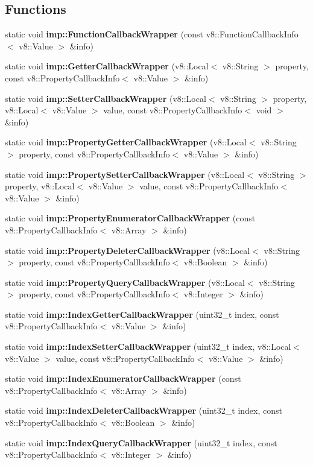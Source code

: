 \subsection*{Functions}
\begin{DoxyCompactItemize}
\item 
static void \textbf{ imp\+::\+Function\+Callback\+Wrapper} (const v8\+::\+Function\+Callback\+Info$<$ v8\+::\+Value $>$ \&info)
\item 
static void \textbf{ imp\+::\+Getter\+Callback\+Wrapper} (v8\+::\+Local$<$ v8\+::\+String $>$ property, const v8\+::\+Property\+Callback\+Info$<$ v8\+::\+Value $>$ \&info)
\item 
static void \textbf{ imp\+::\+Setter\+Callback\+Wrapper} (v8\+::\+Local$<$ v8\+::\+String $>$ property, v8\+::\+Local$<$ v8\+::\+Value $>$ value, const v8\+::\+Property\+Callback\+Info$<$ void $>$ \&info)
\item 
static void \textbf{ imp\+::\+Property\+Getter\+Callback\+Wrapper} (v8\+::\+Local$<$ v8\+::\+String $>$ property, const v8\+::\+Property\+Callback\+Info$<$ v8\+::\+Value $>$ \&info)
\item 
static void \textbf{ imp\+::\+Property\+Setter\+Callback\+Wrapper} (v8\+::\+Local$<$ v8\+::\+String $>$ property, v8\+::\+Local$<$ v8\+::\+Value $>$ value, const v8\+::\+Property\+Callback\+Info$<$ v8\+::\+Value $>$ \&info)
\item 
static void \textbf{ imp\+::\+Property\+Enumerator\+Callback\+Wrapper} (const v8\+::\+Property\+Callback\+Info$<$ v8\+::\+Array $>$ \&info)
\item 
static void \textbf{ imp\+::\+Property\+Deleter\+Callback\+Wrapper} (v8\+::\+Local$<$ v8\+::\+String $>$ property, const v8\+::\+Property\+Callback\+Info$<$ v8\+::\+Boolean $>$ \&info)
\item 
static void \textbf{ imp\+::\+Property\+Query\+Callback\+Wrapper} (v8\+::\+Local$<$ v8\+::\+String $>$ property, const v8\+::\+Property\+Callback\+Info$<$ v8\+::\+Integer $>$ \&info)
\item 
static void \textbf{ imp\+::\+Index\+Getter\+Callback\+Wrapper} (uint32\+\_\+t index, const v8\+::\+Property\+Callback\+Info$<$ v8\+::\+Value $>$ \&info)
\item 
static void \textbf{ imp\+::\+Index\+Setter\+Callback\+Wrapper} (uint32\+\_\+t index, v8\+::\+Local$<$ v8\+::\+Value $>$ value, const v8\+::\+Property\+Callback\+Info$<$ v8\+::\+Value $>$ \&info)
\item 
static void \textbf{ imp\+::\+Index\+Enumerator\+Callback\+Wrapper} (const v8\+::\+Property\+Callback\+Info$<$ v8\+::\+Array $>$ \&info)
\item 
static void \textbf{ imp\+::\+Index\+Deleter\+Callback\+Wrapper} (uint32\+\_\+t index, const v8\+::\+Property\+Callback\+Info$<$ v8\+::\+Boolean $>$ \&info)
\item 
static void \textbf{ imp\+::\+Index\+Query\+Callback\+Wrapper} (uint32\+\_\+t index, const v8\+::\+Property\+Callback\+Info$<$ v8\+::\+Integer $>$ \&info)
\end{DoxyCompactItemize}
